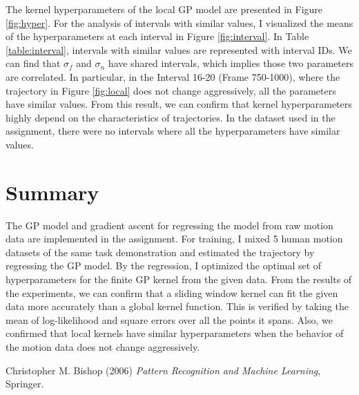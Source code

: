 \documentclass[conference]{IEEEtran}
\begin{document}
The kernel hyperparameters of the local GP model are presented in Figure \ref{fig:hyper}.
For the analysis of intervals with similar values, I visualized the means of the hyperparameters at each interval in Figure \ref{fig:interval}.
In Table \ref{table:interval}, intervals with similar values are represented with interval IDs.
We can find that $\sigma_f$ and $\sigma_n$ have shared intervals, which implies those two parameters are correlated. 
In particular, in the Interval 16-20 (Frame 750-1000), where the trajectory in Figure \ref{fig:local} does not change aggressively, all the parameters have similar values.
From this result, we can confirm that kernel hyperparameters highly depend on the characteristics of trajectories.
In the dataset used in the assignment, there were no intervals where all the hyperparameters have similar values.

\section{Summary} %

The GP model and gradient ascent for regressing the model from raw motion data are implemented in the assignment. 
For training, I mixed 5 human motion datasets of the same task demonstration and estimated the trajectory by regressing the GP model.
By the regression, I optimized the optimal set of hyperparameters for the finite GP kernel from the given data.
From the results of the experiments, we can confirm that a sliding window kernel can fit the given data more accurately than a global kernel function.
This is verified by taking the mean of log-likelihood and square errors over all the points it spans.
Also, we confirmed that local kernels have similar hyperparameters when the behavior of the motion data does not change aggressively.



\begin{thebibliography}{9}
Christopher M. Bishop (2006) \emph{Pattern Recognition and Machine Learning}, Springer.
\end{thebibliography}
\end{document}
